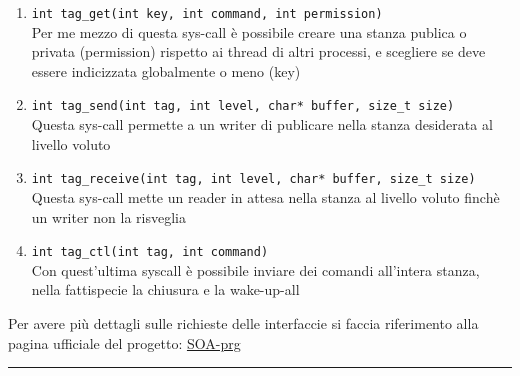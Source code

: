 \begin{enumerate}
	\item \verb|int tag_get(int key, int command, int permission)|\\
	Per me mezzo di questa sys-call è possibile creare una stanza publica o privata (permission)
	rispetto ai thread di altri processi, e scegliere se deve essere indicizzata globalmente o meno (key)
	\item \verb|int tag_send(int tag, int level, char* buffer, size_t size)|\\
	Questa sys-call permette a un writer di publicare nella stanza desiderata al livello voluto
	\item \verb|int tag_receive(int tag, int level, char* buffer, size_t size)|\\
	Questa sys-call mette un reader in attesa nella stanza al livello voluto finchè un writer non la risveglia
	\item \verb|int tag_ctl(int tag, int command)|\\
	Con quest'ultima syscall è possibile inviare dei comandi all'intera stanza, nella fattispecie la chiusura e la wake-up-all
\end{enumerate}
Per avere più dettagli sulle richieste delle interfaccie si faccia riferimento alla pagina ufficiale del progetto: \href{https://francescoquaglia.github.io/TEACHING/AOS/PROJECTS/project-specification-2020-2021.html}{SOA-prg}

	\rule{\textwidth}{0.2pt}
